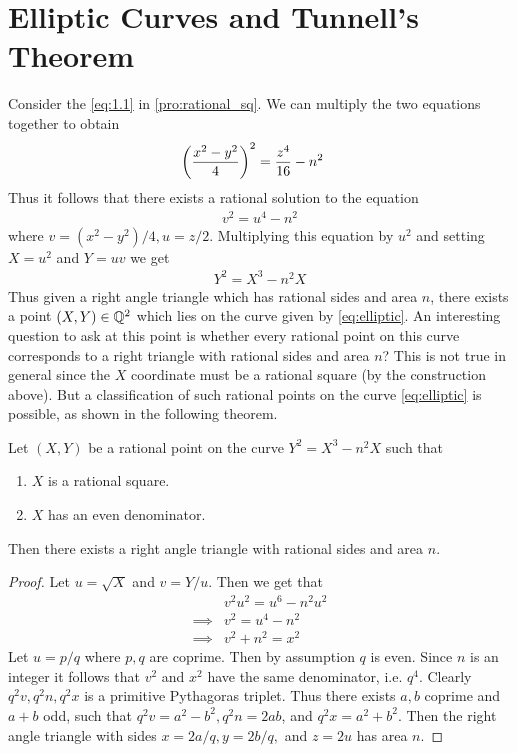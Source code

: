 \section{Elliptic Curves and Tunnell's Theorem}
Consider the \cref{eq:1.1} in \cref{pro:rational_sq}. We can multiply the two equations together to obtain
\begin{align*}
  \left(\frac{x^2 - y^2}{4}\right)^2 &= \frac{z^4}{16} - n^2
\end{align*}
Thus it follows that there exists a rational solution to the equation
\begin{align*}
  v^2 = u^4 - n^2
\end{align*}
where $v = (x^2 - y^2)/4, u = z/2$. Multiplying this equation by $u^2$ and setting $X = u^2$ and $Y = uv$ we get
\begin{align}\label{eq:elliptic}
  Y^2 = X^3 - n^2X
\end{align}
Thus given a right angle triangle which has rational sides and area $n$, there exists a point $(X,Y)\in \mathbb{Q}^2$ which lies on the curve given by \cref{eq:elliptic}. An interesting question to ask at this point is whether every rational point on this curve corresponds to a right triangle with rational sides and area $n$? This is not true in general since the $X$ coordinate must be a rational square (by the construction above). But a classification of such rational points on the curve \cref{eq:elliptic} is possible, as shown in the following theorem.

\begin{theorem}
  Let $(X,Y)$ be a rational point on the curve $Y^2 = X^3 - n^2X$ such that
  \begin{enumerate}
    \item $X$ is a rational square.
    \item $X$ has an even denominator.
  \end{enumerate}
  Then there exists a right angle triangle with rational sides and area $n$.
\end{theorem}
\begin{proof}
  Let $u = \sqrt{X}$ and $v = Y/u$. Then we get that
  \begin{align*}
    &v^2u^2 = u^6 - n^2 u^2\\
    \implies &v^2 = u^4 - n^2\\
    \implies &v^2 + n^2 = x^2
  \end{align*}
  Let $u = p/q$ where $p,q$ are coprime. Then by assumption $q$ is even. Since $n$ is an integer it follows that $v^2$ and $x^2$ have the same denominator, i.e. $q^4$. Clearly $q^2v, q^2n, q^2x$ is a primitive Pythagoras triplet. Thus there exists $a,b$ coprime and $a+b$ odd, such that $q^2v = a^2 - b^2, q^2n = 2ab$, and $q^2x = a^2 + b^2$. Then the right angle triangle with sides $x = 2a/q, y = 2b/q,$ and $z = 2u$ has area $n$.
\end{proof}

